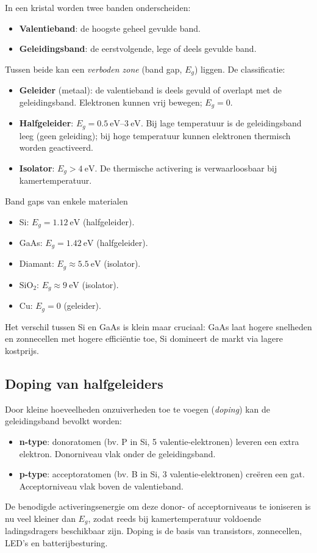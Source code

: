 In een kristal worden twee banden onderscheiden:
\begin{itemize}
\item \textbf{Valentieband}: de hoogste geheel gevulde band.
\item \textbf{Geleidingsband}: de eerstvolgende, lege of deels gevulde band.
\end{itemize}
Tussen beide kan een \emph{verboden zone} (band gap, $E_g$) liggen. De classificatie:
\begin{itemize}
\item \textbf{Geleider} (metaal): de valentieband is deels gevuld of overlapt met de geleidingsband. Elektronen kunnen vrij bewegen; $E_g = 0$.
\item \textbf{Halfgeleider}: $E_g = \SIrange{0.5}{3}{\electronvolt}$. Bij lage temperatuur is de geleidingsband leeg (geen geleiding); bij hoge temperatuur kunnen elektronen thermisch worden geactiveerd.
\item \textbf{Isolator}: $E_g > \SI{4}{\electronvolt}$. De thermische activering is verwaarloosbaar bij kamertemperatuur.
\end{itemize}

\begin{voorbeeld}{Band gaps van enkele materialen}
\begin{itemize}
\item Si: $E_g = \SI{1.12}{\electronvolt}$ (halfgeleider).
\item GaAs: $E_g = \SI{1.42}{\electronvolt}$ (halfgeleider).
\item Diamant: $E_g \approx \SI{5.5}{\electronvolt}$ (isolator).
\item $\mathrm{SiO_2}$: $E_g \approx \SI{9}{\electronvolt}$ (isolator).
\item Cu: $E_g = 0$ (geleider).
\end{itemize}
Het verschil tussen Si en GaAs is klein maar cruciaal: GaAs laat hogere snelheden en zonnecellen met hogere effici\"entie toe, Si domineert de markt via lagere kostprijs.
\end{voorbeeld}

\subsection{Doping van halfgeleiders}
\label{sec:doping}

Door kleine hoeveelheden onzuiverheden toe te voegen (\emph{doping}) kan de geleidingsband bevolkt worden:
\begin{itemize}
\item \textbf{n-type}: donoratomen (bv. P in Si, 5 valentie-elektronen) leveren een extra elektron. Donorniveau vlak onder de geleidingsband.
\item \textbf{p-type}: acceptoratomen (bv. B in Si, 3 valentie-elektronen) cre\"eren een gat. Acceptorniveau vlak boven de valentieband.
\end{itemize}
De benodigde activeringsenergie om deze donor- of acceptorniveaus te ioniseren is nu veel kleiner dan $E_g$, zodat reeds bij kamertemperatuur voldoende ladingsdragers beschikbaar zijn. Doping is de basis van transistors, zonnecellen, LED's en batterijbesturing.

